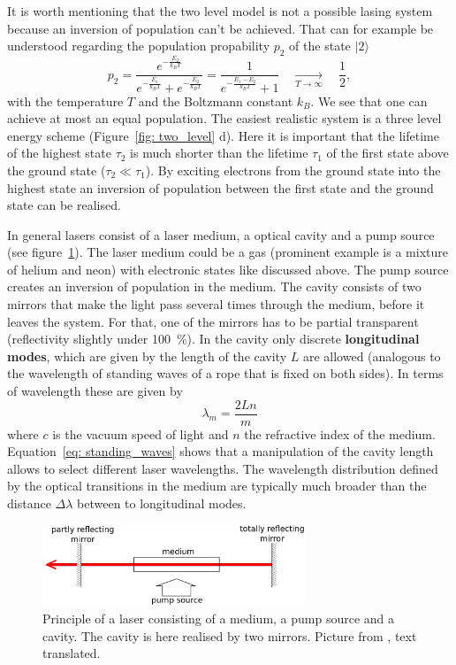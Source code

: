 It is worth mentioning that the two level model is not a possible lasing system because an inversion of population
can't be achieved. That can for example be understood
regarding the population propability $p_2$ of the state $|2\rangle$
\begin{equation}
  p_2 = \frac{e^{-\frac{E_2}{k_B T}}}{ e^{-\frac{E_1}{k_B T}} + e^{-\frac{E_2}{k_B T}} } =
  \frac{1}{ e^{-\frac{E_1 - E_2}{k_B T}} + 1}
    \quad \underset{T \rightarrow \infty}{\longrightarrow}\quad  \frac{1}{2},
\end{equation}
with the temperature $T$ and the Boltzmann constant $k_B$. We see that one can achieve at most an equal population. The easiest
realistic system is a three level energy scheme (Figure~\ref{fig: two_level} d). Here it is important that the lifetime of the highest state $\tau_2$ is much shorter
than the lifetime $\tau_1$ of the first state above the ground state ($\tau_2 \ll \tau_1$). By exciting electrons from the ground state into the highest
state an inversion of population between the first state and the ground state can be realised.

In general lasers consist of a laser medium, a optical cavity and a pump source (see figure~\ref{fig: principle_laser}).
The laser medium could be a gas (prominent example is a mixture of helium and neon) with electronic states like discussed above. The pump source
creates an inversion of population in the medium. The cavity consists of two mirrors that make the light pass several times through the medium, before
it leaves the system. For that, one of the mirrors has to be partial transparent (reflectivity slightly under \SI{100}{\percent}). In the
cavity only discrete \textbf{longitudinal modes}, which are given by the length of the cavity $L$ are allowed (analogous 
to the wavelength of standing waves of a rope that is fixed on both sides). In terms of wavelength these are
given by
\begin{equation}
  \lambda_m = \frac{2 L n}{m}
  \label{eq: standing_waves}
\end{equation}
where $c$ is the vacuum speed of light and $n$ the refractive index of the medium. Equation~\eqref{eq: standing_waves} shows that a manipulation of the
cavity length allows to select different laser wavelengths. The wavelength distribution defined by the optical transitions in the medium 
are typically much broader than the distance $\Delta \lambda$ between to longitudinal modes. 

\begin{figure}
  \centering
  \includegraphics[width = 0.7\textwidth]{pics/prinzip_laser.png}
  \caption{Principle of a laser consisting of a medium, a pump source and a cavity. The cavity is here realised by two mirrors.
  Picture from \cite{anleitung61}, text translated.}
  \label{fig: principle_laser}
\end{figure}

